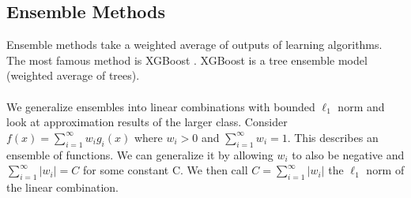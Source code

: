 \documentclass{article}
\begin{document}
   \subsection{Ensemble Methods}
   Ensemble methods take a weighted average of outputs of learning algorithms. The most famous method is XGBoost \cite{DBLP:journals/corr/ChenG16}. XGBoost is a tree ensemble model (weighted average of trees).
   \\\\
   We generalize ensembles into linear combinations with bounded $\ell_1$ norm and look at approximation results of the larger class. Consider $f(x)=\sum_{i=1}^{\infty} w_ig_i(x)$ where $w_i > 0$ and $\sum_{i=1}^{\infty} w_i = 1$. This describes an ensemble of functions. We can generalize it by allowing $w_i$ to also be negative and $\sum_{i=1}^{\infty} |w_i|=C$ for some constant C. We then call $C = \sum_{i=1}^{\infty} |w_i|$ the $\ell_1$ norm of the linear combination.
   
   
   
   
\end{document}
